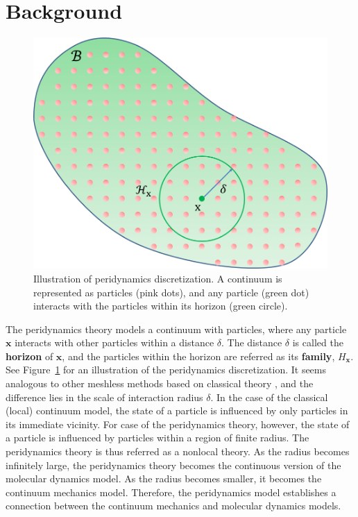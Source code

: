\section{Background}\label{section:3}

\begin{figure}[t]
  \centering
  \includegraphics[width=0.7\linewidth, bb=0 0 440 355]{../figs/peridynamics_circle.png}
  \caption{\label{fig:2}
  Illustration of peridynamics discretization. A continuum is represented as particles (pink dots), and any particle (green dot) interacts with the particles within its horizon (green circle).
}
\end{figure}
The peridynamics theory models a continuum with particles, where any particle $\mathbf{x}$ interacts with other particles within a distance $\delta$. The distance $\delta$ is called the \textbf{horizon} of $\mathbf{x}$, and the particles within the horizon are referred as its \textbf{family}, $H_\mathbf{x}$. See Figure~\ref{fig:2} for an illustration of the peridynamics discretization. It seems analogous to other meshless methods based on classical theory \cite{Muller:2003:PFS:846276.846298,Muller:2004:PBA:1028523.1028542}, and the difference lies in the scale of interaction radius $\delta$. In the case of the classical (local) continuum model, the state of a particle is influenced by only particles in its immediate vicinity. For case of the peridynamics theory, however, the state of a particle is influenced by particles within a region of finite radius. The peridynamics theory is thus referred as a nonlocal theory. As the radius becomes infinitely large, the peridynamics theory becomes the continuous version of the molecular dynamics model. As the radius becomes smaller, it becomes the continuum mechanics model. Therefore, the peridynamics model establishes a connection between the continuum mechanics and molecular dynamics models.

